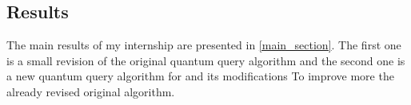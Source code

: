 \subsection{Results}

The main results of my internship are presented in \autoref{main_section}. The first
one is a small revision of the original quantum query algorithm \cite{art:2DGrid}
and the second one is a new quantum query algorithm for  and its
modifications To improve more the already revised original algorithm.